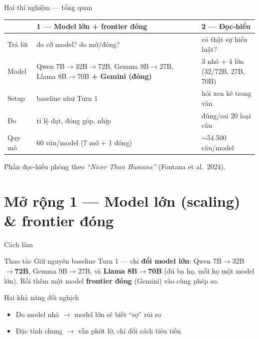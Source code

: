 \documentclass[aspectratio=169,10pt]{beamer}
\newcommand{\take}[1]{\vfill{\footnotesize\textcolor{green!45!black}{#1}}}
\begin{document}
\begin{frame}{Hai thí nghiệm --- tổng quan}
  \centering
  \setlength{\tabcolsep}{10pt}\renewcommand{\arraystretch}{1.3}
  \begin{tabular}{lll}
    \toprule
    & \textbf{1 --- Model lớn + frontier đóng} & \textbf{2 --- Đọc-hiểu} \\
    \midrule
    Trả lời   & do cỡ model? do mở/đóng? & có thật sự hiểu luật? \\
    Model     & \makecell[l]{Qwen 7B$\to$32B$\to$72B, Gemma 9B$\to$27B,\\Llama 8B$\to$70B \;\textbf{+ Gemini (đóng)}} & \makecell[l]{3 nhỏ + 4 lớn\\(32/72B, 27B, 70B)} \\
    Setup     & baseline như Turn 1 & hỏi xen kẽ trong ván \\
    Đo        & tỉ lệ đạt, đóng góp, nhịp & đúng/sai 20 loại câu \\
    Quy mô    & 60 ván/model (7 mở + 1 đóng) & $\sim$54.500 câu/model \\
    \bottomrule
  \end{tabular}
  \take{Phần đọc-hiểu phỏng theo \emph{``Nicer Than Humans''} (Fontana et al.\ 2024).}
\end{frame}

\section{Mở rộng 1 --- Model lớn (scaling) \& frontier đóng}

\begin{frame}{Cách làm}
  \begin{block}{Thao tác}
    Giữ nguyên baseline Turn 1 --- chỉ \textbf{đổi model lớn}: Qwen 7B$\to$32B$\to$\textbf{72B}, Gemma 9B$\to$27B, và \textbf{Llama 8B$\to$70B} (đủ ba họ, mỗi họ một model lớn). Rồi thêm một model \textbf{frontier đóng} (Gemini) vào cùng phép so.
  \end{block}
  \begin{exampleblock}{Hai khả năng đối nghịch}
    \begin{itemize}\setlength\itemsep{4pt}
      \item Do model nhỏ \;$\to$\; model lớn sẽ biết ``sợ'' rủi ro
      \item Đặc tính chung \;$\to$\; vẫn phớt lờ, chỉ đổi cách tiêu tiền
    \end{itemize}
  \end{exampleblock}
\end{frame}
\end{document}
